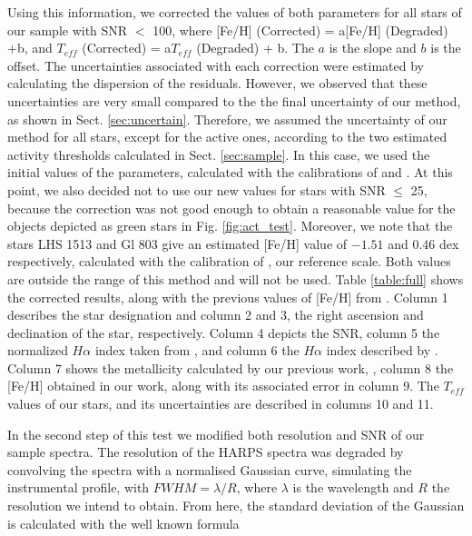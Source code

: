 \documentclass[referee]{aa}
\begin{document}
Using this information, we corrected the values of both parameters for all stars of our sample with SNR $<$ 100, where [Fe/H] (Corrected) = a[Fe/H] (Degraded) +b, and $T_{eff}$ (Corrected) = a$T_{eff}$ (Degraded) + b. The $a$ is the slope and $b$ is the offset. The uncertainties associated with each correction were estimated by calculating the dispersion of the residuals. However, we observed that these uncertainties are very small compared to the the final uncertainty of our method, as shown in Sect. \ref{sec:uncertain}. Therefore, we assumed the uncertainty of our method for all stars, except for the active ones, according to the two estimated activity thresholds calculated in Sect. \ref{sec:sample}. In this case, we used the initial values of the parameters, calculated with the calibrations of \citet{Neves-2012} and \citet{Casagrande-2008}. At this point, we also decided not to use our new values for stars with SNR $\leq$ 25, because the correction was not good enough to obtain a reasonable value for the objects depicted as green stars in Fig. \ref{fig:act_test}. Moreover, we note that the stars LHS 1513 and Gl 803 give an estimated [Fe/H] value of $-1.51$ and $0.46$ dex respectively, calculated with the calibration of \citet{Neves-2012}, our reference scale. Both values are outside the range of this method and will not be used. Table \ref{table:full} shows the corrected results, along with the previous values of [Fe/H] from \citet{Neves-2013}. Column 1 describes the star designation and column 2 and 3, the right ascension and declination of the star, respectively. Column 4 depicts the SNR, column 5 the normalized $H\alpha$ index taken from \citet{Reiners-2012}, and column 6 the $H\alpha$ index described by \citet{Gomes_da_Silva-2011}. Column 7 shows the metallicity calculated by our previous work, \citet{Neves-2013}, column 8 the [Fe/H] obtained in our work, along with its associated error in column 9. The $T_{eff}$ values of our stars, and its uncertainties are described in columns 10 and 11.    %

\addtocounter{table}{1}


In the second step of this test we modified both resolution and SNR of our sample spectra. The resolution of the HARPS spectra was degraded by convolving the spectra with a normalised Gaussian curve, simulating the instrumental profile, with $FWHM = \lambda/R$, where $\lambda$ is the wavelength and $R$ the resolution we intend to obtain. %
From here, the standard deviation of the Gaussian is calculated with the well known formula 
\end{document}
